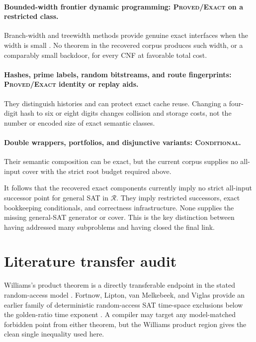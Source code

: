 \documentclass[11pt]{article}
\newcommand{\R}{\mathcal R}
\begin{document}
\paragraph{Bounded-width frontier dynamic programming: \textsc{Proved/Exact}
on a restricted class.}
Branch-width and treewidth methods provide genuine exact interfaces when the
width is small \cite{AlekhnovichRazborov2002,AllenderEtAl2014}.  No theorem in
the recovered corpus produces such width, or a comparably small backdoor, for
every CNF at favorable total cost.

\paragraph{Hashes, prime labels, random bitstreams, and route fingerprints:
\textsc{Proved/Exact} identity or replay aids.}
They distinguish histories and can protect exact cache reuse.  Changing a
four-digit hash to six or eight digits changes collision and storage costs,
not the number or encoded size of exact semantic classes.

\paragraph{Double wrappers, portfolios, and disjunctive variants:
\textsc{Conditional}.}
Their semantic composition can be exact, but the current corpus supplies no
all-input cover with the strict root budget required above.

It follows that the recovered exact components currently imply no strict
all-input successor point for general SAT in $\R$.  They imply restricted
successors, exact bookkeeping conditionals, and correctness infrastructure.
None supplies the missing general-SAT generator or cover.  This is the key
distinction between having addressed many subproblems and having closed the
final link.

\section{Literature transfer audit}

Williams's product theorem is a directly transferable endpoint in the stated
random-access model \cite{Williams2010}.  Fortnow, Lipton, van Melkebeek, and
Viglas provide an earlier family of deterministic random-access SAT
time-space exclusions below the golden-ratio time exponent
\cite{FortnowEtAl2005}.  A compiler may target any model-matched forbidden
point from either theorem, but the Williams product region gives the clean
single inequality used here.
\end{document}
